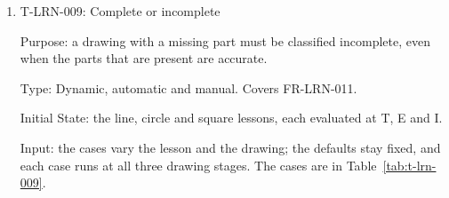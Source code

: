 \documentclass[12pt, titlepage]{article}
\newcommand{\testitem}[1]{\item #1\par\nopagebreak}
\begin{document}
\begin{enumerate}
Output: the expected output of each case is in its row of
Table~\ref{tab:t-lrn-008}; the test passes when every case gives it.

Test Case Derivation: (a) to (c) are the three inputs the fit criterion
names. (f) is the shortest input of SRS Section~9.2, which is invalid and not a
failed attempt. (d) tries to make invalid input count toward the limit (H-AHM-006).
(e) checks that invalid input leaves no trace. Input that cannot be mapped
to the drawing area is covered by T-SAF-010.

How test will be performed: Vitest sends each file to the input handler
and the evaluation. Playwright replays (a) to (e), with 40 replayed as
\texttt{circle-\allowbreak{}fail.json}.

\testitem{T-LRN-009: Complete or incomplete}

Purpose: a drawing with a missing part must be classified incomplete, even
when the parts that are present are accurate.

Type: Dynamic, automatic and manual. Covers FR-LRN-011.

Initial State: the line, circle and square lessons, each evaluated at T, E
and I.

Input: the cases vary the lesson and the drawing; the defaults stay fixed,
and each case runs at all three drawing stages. The cases are in
Table~\ref{tab:t-lrn-009}.


\end{enumerate}
\end{document}
